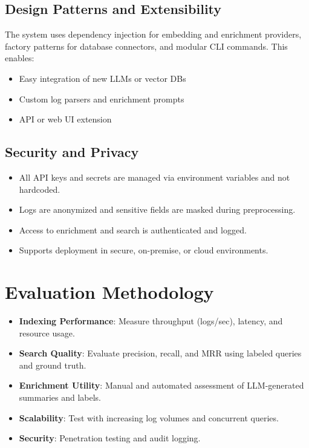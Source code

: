 \documentclass{article}
\begin{document}
\subsection{Design Patterns and Extensibility}
The system uses dependency injection for embedding and enrichment providers, factory patterns for database connectors, and modular CLI commands. This enables:
\begin{itemize}
    \item Easy integration of new LLMs or vector DBs
    \item Custom log parsers and enrichment prompts
    \item API or web UI extension
\end{itemize}

\subsection{Security and Privacy}
\begin{itemize}
    \item All API keys and secrets are managed via environment variables and not hardcoded.
    \item Logs are anonymized and sensitive fields are masked during preprocessing.
    \item Access to enrichment and search is authenticated and logged.
    \item Supports deployment in secure, on-premise, or cloud environments.
\end{itemize}

\section{Evaluation Methodology}
\begin{itemize}
    \item \textbf{Indexing Performance}: Measure throughput (logs/sec), latency, and resource usage.
    \item \textbf{Search Quality}: Evaluate precision, recall, and MRR using labeled queries and ground truth.
    \item \textbf{Enrichment Utility}: Manual and automated assessment of LLM-generated summaries and labels.
    \item \textbf{Scalability}: Test with increasing log volumes and concurrent queries.
    \item \textbf{Security}: Penetration testing and audit logging.
\end{itemize}
\end{document}
